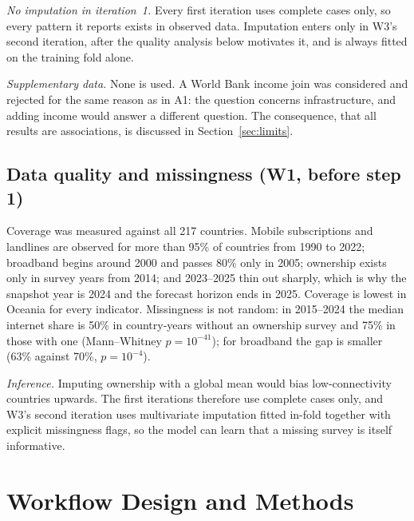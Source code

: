 \documentclass[conference,a4paper]{IEEEtran}
\newcommand{\inference}[1]{\par\smallskip\noindent\textit{Inference.} #1\par\smallskip}
\begin{document}
\textit{No imputation in iteration~1.} Every first iteration uses complete cases only, so every
pattern it reports exists in observed data. Imputation enters only in W3's second iteration, after
the quality analysis below motivates it, and is always fitted on the training fold alone.

\textit{Supplementary data.} None is used. A World Bank income join was considered and rejected for
the same reason as in A1: the question concerns infrastructure, and adding income would answer a
different question. The consequence, that all results are associations, is discussed in
Section~\ref{sec:limits}.

\subsection{Data quality and missingness (W1, before step 1)}
Coverage was measured against all 217 countries. Mobile subscriptions and landlines
are observed for more than 95\% of countries from 1990 to 2022; broadband begins around 2000 and
passes 80\% only in 2005; ownership exists only in survey years from 2014; and 2023--2025 thin out
sharply, which is why the snapshot year is 2024 and the forecast horizon ends in 2025. Coverage is
lowest in Oceania for every indicator. Missingness is not random: in 2015--2024 the median internet
share is 50\% in country-years without an ownership survey and 75\% in those with one
(Mann--Whitney $p=10^{-41}$); for broadband the gap is smaller (63\% against 70\%, $p=10^{-4}$).

\inference{Imputing ownership with a global mean would bias low-connectivity countries upwards.
The first iterations therefore use complete cases only, and W3's second iteration uses multivariate
imputation fitted in-fold together with explicit missingness flags, so the model can learn that a
missing survey is itself informative.}

\section{Workflow Design and Methods}\label{sec:methods}
\end{document}
